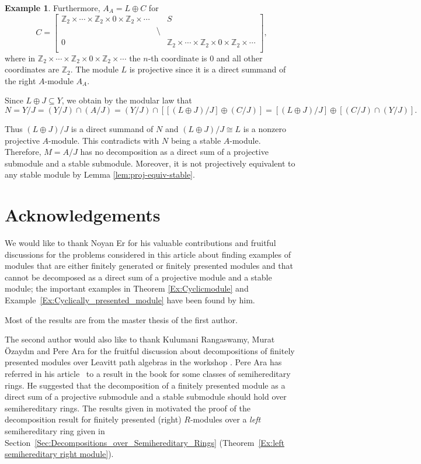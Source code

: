 \documentclass[11pt,a4paper]{amsart}
\theoremstyle{plain}
\theoremstyle{definition}
\newtheorem{example}[theorem]{Example}
\theoremstyle{remark}
\newcommand{\Z}{{\mathbb{Z}}}
\begin{document}
\begin{example}
Furthermore, $A_A=L\oplus C$ for \[C= \left[\begin{array}{lll}
 \Z_{2}\times\cdots \times \Z_{2}\times 0 \times \Z_{2} \times \cdots& & S \\
           & \setminus & \\
       0 & &\Z_{2} \times \cdots \times \Z_{2} \times 0 \times \Z_{2} \times \cdots \\       \end{array}\right],\] where in $ \Z_{2} \times \cdots \times \Z_{2} \times 0 \times \Z_{2} \times \cdots $ the $n$-th coordinate is $0$ and all other coordinates are $\Z_2$.
The module $L$ is projective since it is a direct summand of the right $A$-module $A_A$.



Since $L\oplus {J}\subseteq Y$, we obtain by the modular law that
\[
N=Y/{J}
=(Y/J) \cap  (A/J)
= (Y/J) \cap  [[(L\oplus {J})/{J} ]\oplus (C/{J})]
= \left[(L\oplus {J})/{J}\right]\oplus \left[(C/{J})\cap (Y/{J})\right]
.\]

Thus $ (L\oplus{J})/{J} $ is a direct summand of $N$ and $ (L\oplus{J})/{J}  \cong  L $ is a nonzero projective $A$-module. This contradicts with $N$ being a stable $A$-module. Therefore, $M=A/{J}$ has no decomposition as a direct sum of a projective submodule and a stable submodule. Moreover, it is {not projectively equivalent to any stable module} by Lemma \ref{lem:proj-equiv-stable}.
\end{example}

\section*{Acknowledgements}

We would like to thank Noyan Er for his valuable contributions and fruitful discussions for the problems considered in this article about finding examples of modules that are either finitely generated or finitely presented modules and that cannot be decomposed as a direct sum of a projective module and a stable module; the important examples in Theorem \ref{Ex:Cyclicmodule} and Example~\ref{Ex:Cyclically_presented_module}  have been found by him.

Most of the results are from the
master thesis \cite{GulizarGunay:OnTheAuslanderBridgerTranspose}
of the first author.

The second author would also like to thank Kulumani Rangaswamy, Murat \"{O}zayd{\i}n and Pere Ara for the fruitful discussion about decompositions of finitely presented modules over Leavitt path algebras in the workshop \cite{CIMPA2015}. Pere Ara has referred in his article~\cite{AraAndBrustenga:TheRegularAlgebraOfAQuiver} to a result in the book \cite{Luck:L2invariants} for some classes of semihereditary rings. He suggested that the decomposition of a finitely presented module as a direct sum of a projective submodule and a stable submodule should hold over semihereditary rings. The results given in \cite[Theorem~6.7]{Luck:L2invariants}  motivated the proof of the decomposition result for finitely presented (right) $R$-modules over a \emph{left} semihereditary ring given in Section~\ref{Sec:Decompositions_over_Semihereditary_Rings} (Theorem~\ref{Ex:left semihereditary right module}).
\end{document}
